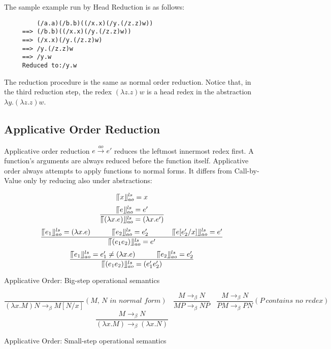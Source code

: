 \documentclass[a4paper,11pt,twoside]{report}
\begin{document}
The sample example run by Head Reduction is as follows:

\begin{verbatim}
         (/a.a)(/b.b)((/x.x)(/y.(/z.z)w))
     ==> (/b.b)((/x.x)(/y.(/z.z)w))
     ==> (/x.x)(/y.(/z.z)w)
     ==> /y.(/z.z)w
     ==> /y.w
     Reduced to:/y.w
\end{verbatim}

The reduction procedure is the same as normal order reduction. Notice that, in the third reduction step, the redex $(\lambda z.z)w$ is a head redex in the abstraction $\lambda y.(\lambda z.z)w$. 

\subsection{Applicative Order Reduction}

Applicative order reduction $e\xrightarrow{ao} e'$ reduces the leftmost innermost redex first. A function's arguments are always reduced before the function itself. Applicative order always attempts to apply functions to normal forms. It differs from Call-by-Value only by reducing also under abstractions:


\begin{equation*}
\llceil x \rrfloor ^{ls} _{ao} = x
\end{equation*}
\begin{equation*}
\frac{\llceil e \rrfloor ^{ls} _{ao} = e'}{\llceil (\lambda x.e) \rrfloor ^{ls} _{ao} = (\lambda x.e')}
\end{equation*}
\begin{equation*}
\frac{\llceil e_1 \rrfloor ^{ls} _{ao} = (\lambda x.e)\ \ \ \ \ \ \ \ \ \llceil e_2 \rrfloor ^{ls} _{ao} = e'_2\ \ \ \ \ \ \ \ \ \ \llceil e[e'_2/x] \rrfloor ^{ls} _{ao} = e'}{\llceil (e_1e_2) \rrfloor ^{ls} _{ao} = e'}
\end{equation*}
\begin{equation*}
\frac{\llceil e_1 \rrfloor ^{ls} _{ao} = e'_1\neq (\lambda x.e)\ \ \ \ \ \ \ \ \ \llceil e_2 \rrfloor ^{ls} _{ao} = e'_2}{\llceil (e_1e_2) \rrfloor ^{ls} _{ao} = (e'_1e'_2)}
\end{equation*}
\begin{center}
Applicative Order: Big-step operational semantics
\end{center}

\begin{equation*}
\frac{}{(\lambda x.M)N \rightarrow _\beta M[N/x]}(\textit{M, N in normal form})\ \ \ \ 
\frac{M \rightarrow _\beta N}{MP \rightarrow _\beta NP}\ \ \ \ 
\frac{M \rightarrow _\beta N}{PM \rightarrow _\beta PN}(P\ \textit{contains no redex})\ \ \ \ 
\end{equation*}
\begin{equation*}
\frac{M \rightarrow _\beta N}{(\lambda x.M) \rightarrow _\beta (\lambda x.N)}
\end{equation*}
\begin{center}
Applicative Order: Small-step operational semantics
\end{center}
\end{document}
